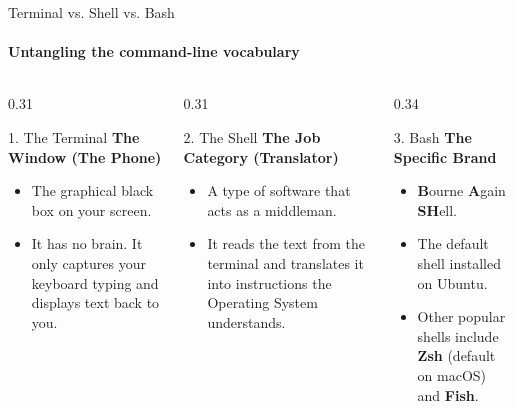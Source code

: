 \begin{frame}{Terminal vs. Shell vs. Bash}
\framesubtitle{Untangling the command-line vocabulary}

\footnotesize

\begin{columns}[T]

    \begin{column}{0.31\textwidth}
        \begin{block}{1. The Terminal}
            \textbf{The Window (The Phone)}
            \begin{itemize}
                \setlength{\itemsep}{0.2em}
                \item The graphical black box on your screen.
                \item It has no brain. It only captures your keyboard typing and displays text back to you.
            \end{itemize}
        \end{block}
    \end{column}

    \begin{column}{0.31\textwidth}
        \begin{block}{2. The Shell}
            \textbf{The Job Category (Translator)}
            \begin{itemize}
                \setlength{\itemsep}{0.2em}
                \item A type of software that acts as a middleman.
                \item It reads the text from the terminal and translates it into instructions the Operating System understands.
            \end{itemize}
        \end{block}
    \end{column}

    \begin{column}{0.34\textwidth}
        \begin{exampleblock}{3. Bash}
            \textbf{The Specific Brand}
            \begin{itemize}
                \setlength{\itemsep}{0.2em}
                \item \textbf{B}ourne \textbf{A}gain \textbf{SH}ell.
                \item The default shell installed on Ubuntu. 
                \item Other popular shells include \textbf{Zsh} (default on macOS) and \textbf{Fish}.
            \end{itemize}
        \end{exampleblock}
    \end{column}


\end{columns}
\end{frame}
